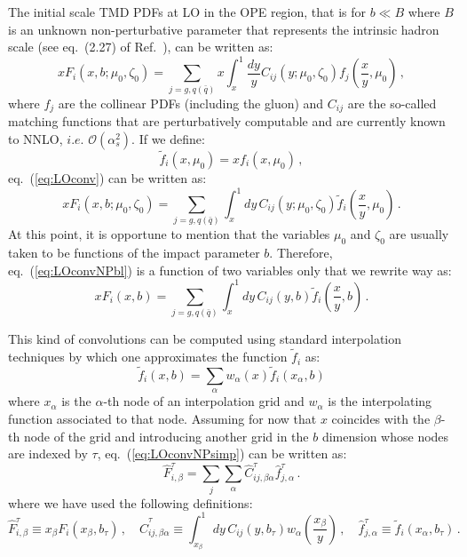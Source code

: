 \documentclass[10pt,a4paper]{article}
\begin{document}
The initial scale TMD PDFs at LO in the OPE region, that is for
$b\ll B$ where $B$ is an unknown non-perturbative parameter that
represents the intrinsic hadron scale (see eq.~(2.27) of
Ref.~\cite{Scimemi:2017etj}), can be written as:
\begin{equation}\label{eq:LOconv}
xF_i(x,b;\mu_0,\zeta_0) = \sum_{j=g,q(\bar{q})}x\int_x^1\frac{dy}{y}C_{ij}(y;\mu_0,\zeta_0)f_j\left(\frac{x}{y},\mu_0\right)\,,
\end{equation}
where $f_j$ are the collinear PDFs (including the gluon) and $C_{ij}$
are the so-called matching functions that are perturbatively
computable and are currently known to NNLO, $i.e.$
$\mathcal{O}(\alpha_s^2)$. If we define:
\begin{equation}
\widetilde{f}_i\left(x,\mu_0\right) = xf_i\left(x,\mu_0\right)\,,
\end{equation}
eq.~(\ref{eq:LOconv}) can be written as:
\begin{equation}\label{eq:LOconvNPbl}
x F_i(x,b;\mu_0,\zeta_0) =
\sum_{j=g,q(\bar{q})}\int_x^1dy\,C_{ij}(y;\mu_0,\zeta_0)  \widetilde{f}_i\left(\frac{x}{y},\mu_0\right)\,.
\end{equation}
At this point, it is opportune to mention that the variables $\mu_0$
and $\zeta_0$ are usually taken to be functions of the impact
parameter $b$. Therefore, eq.~(\ref{eq:LOconvNPbl}) is a function of
two variables only that we rewrite way as:
\begin{equation}\label{eq:LOconvNPsimp}
  x F_i(x,b) =
  \sum_{j=g,q(\bar{q})}\int_x^1dy\,C_{ij}(y,b)  \widetilde{f}_i\left(\frac{x}{y},b\right)\,.
\end{equation}

This kind of convolutions can be computed using standard interpolation
techniques by which one approximates the function $\widetilde{f}_i$ as:
\begin{equation}
  \widetilde{f}_i(x,b) = \sum_\alpha w_\alpha(x) \widetilde{f}_i(x_\alpha,b)
\end{equation}
where $x_\alpha$ is the $\alpha$-th node of an interpolation grid and
$w_\alpha$ is the interpolating function associated to that
node. Assuming for now that $x$ coincides with the $\beta$-th node of
the grid and introducing another grid in the $b$ dimension whose nodes
are indexed by $\tau$, eq.~(\ref{eq:LOconvNPsimp}) can be written as:
\begin{equation}\label{eq:LOconvNPsimp1}
  \hat{F}_{i,\beta}^\tau = \sum_j\sum_\alpha\hat{C}_{ij,\beta\alpha}^\tau \hat{f}_{j,\alpha}^\tau\,.
\end{equation}
where we have used the following definitions:
\begin{equation}
\hat{F}_{i,\beta}^\tau\equiv x_\beta F_i(x_\beta,b_\tau)\,,\quad
\hat{C}_{ij,\beta\alpha}^\tau \equiv
\int_{x_\beta}^1dy\,C_{ij}(y,b_\tau)w_\alpha\left(\frac{x_\beta}{y}\right)\,,\quad
  \hat{f}_{j,\alpha}^\tau \equiv \widetilde{f}_i(x_\alpha,b_\tau)\,.
\end{equation}
\end{document}
